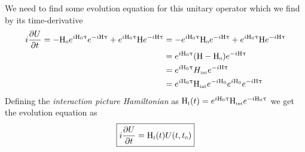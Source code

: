 We need to find some evolution equation for this unitary operator which we find by its time-derivative 
\begin{align*}
    i \pdv{U}{t} = -\MH\tund{0}e^{i\MH\tund{0} \ut}e^{-i\MH\ut} + e^{i\MH\tund{0} \ut}\MH e^{-i\MH\ut} &= -e^{i\MH\tund{0} \ut}\MH\tund{0} e^{-i\MH\ut} + e^{i\MH\tund{0} \ut}\MH e^{-i\MH\ut}\\ &= e^{i\MH\tund{0} \ut}(\MH - \MH\tund{0})e^{-i\MH\ut}\\ &=e^{i\MH\tund{0} \ut}H\tund{int}e^{-i\MH\ut}\\
    &=e^{i\MH\tund{0} \ut}\MH\tund{int}e^{-i\MH\tund{0}} e^{i\MH\tund{0}}e^{-i\MH\ut}
\end{align*}
Defining the \textit{interaction picture Hamiltonian} as $\MH\tund{I}(t) = e^{i\MH\tund{0}\ut} \MH\tund{int} e^{-i \MH\tund{0}\ut}$ we get the evolution equation as 
\begin{equation}\label{eqn:dudt}
    \boxed{i\pdv{U}{t} = \MH\tund{I}(t)U(t,t\tund{0})}
\end{equation}
